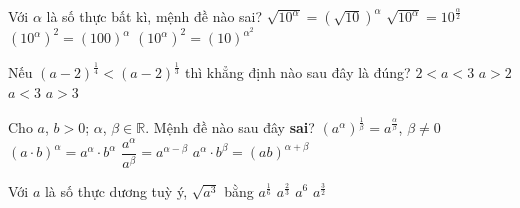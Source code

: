 

\begin{ex}%
	Với $\alpha $ là số thực bất  kì, mệnh đề nào sai?
	\choice 
		{$\sqrt {10^{\alpha}}=\left(\sqrt  {10}\right)^{\alpha}$}
		{$\sqrt {10^{\alpha}}=10^{\frac{\alpha}{2}}$} 
		 {$\left(10^{\alpha}\right)^2=\left(100\right)^{\alpha}$}
		{\True $\left(10^{\alpha}\right)^2=\left(10\right)^{{\alpha}^2}$} 
\end{ex}

\begin{ex}%
	Nếu $\left(a-2\right)^{\tfrac{1}{4}}<\left(a-2\right)^{\tfrac{1}{3}}$ thì khẳng định nào sau đây  là đúng?
	\choice 
		{$2  < a < 3$}
		 {$a > 2$}
		{$a  < 3$}
		{\True $a  > 3$}
\end{ex}

\begin{ex}%
	Cho  $a$, $b>0$; $\alpha$, $\beta \in \mathbb{R}$. Mệnh đề nào sau đây \textbf{sai}?
	 \choice
		{$\left(a^{\alpha}\right)^{\tfrac{1}{\beta}}=a^{\tfrac{\alpha }{\beta }}$,  $\beta \neq 0$}
		 {$(a\cdot b)^{\alpha }=a^{\alpha}\cdot b^{\alpha}$}
		{$\dfrac{a^{\alpha}}{a^{\beta}}=a^{\alpha-\beta}$} 
		 {\True $a^{\alpha}\cdot b^{\beta}=(ab)^{\alpha +\beta }$}
\end{ex}

\begin{ex}%
	Với  $ a$ là số thực dương tuỳ ý, $\sqrt {a^3}$ bằng
	 \choice
		 {$a^{\frac{1}{6}}$}
		 {$a^{\frac{2}{3}}$}
		{$a^6$} 
		 {\True $a^{\frac{3}{2}}$}
\end{ex}


